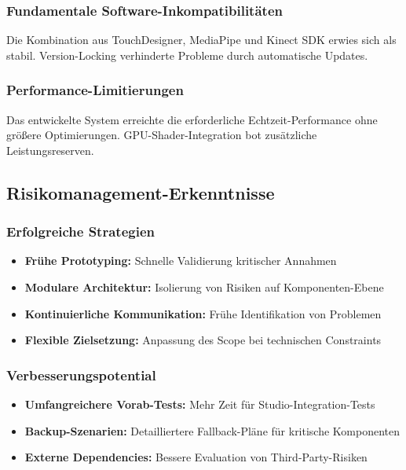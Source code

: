 \subsubsection{Fundamentale Software-Inkompatibilitäten}
Die Kombination aus TouchDesigner, MediaPipe und Kinect SDK erwies sich als stabil. Version-Locking verhinderte Probleme durch automatische Updates.

\subsubsection{Performance-Limitierungen}
Das entwickelte System erreichte die erforderliche Echtzeit-Performance ohne größere Optimierungen. GPU-Shader-Integration bot zusätzliche Leistungsreserven.

\subsection{Risikomanagement-Erkenntnisse}

\subsubsection{Erfolgreiche Strategien}
\begin{itemize}
    \item \textbf{Frühe Prototyping:} Schnelle Validierung kritischer Annahmen
    \item \textbf{Modulare Architektur:} Isolierung von Risiken auf Komponenten-Ebene
    \item \textbf{Kontinuierliche Kommunikation:} Frühe Identifikation von Problemen
    \item \textbf{Flexible Zielsetzung:} Anpassung des Scope bei technischen Constraints
\end{itemize}

\subsubsection{Verbesserungspotential}
\begin{itemize}
    \item \textbf{Umfangreichere Vorab-Tests:} Mehr Zeit für Studio-Integration-Tests
    \item \textbf{Backup-Szenarien:} Detailliertere Fallback-Pläne für kritische Komponenten
    \item \textbf{Externe Dependencies:} Bessere Evaluation von Third-Party-Risiken
\end{itemize}

